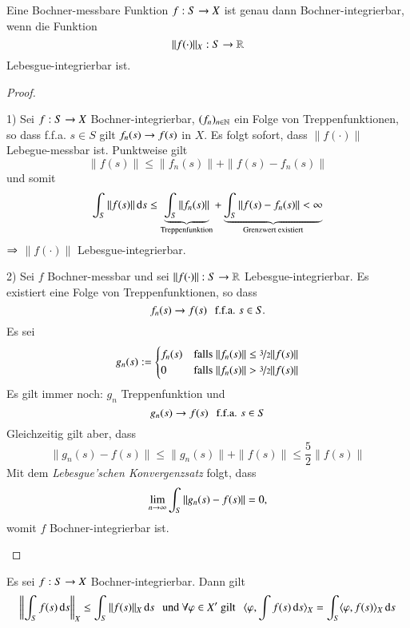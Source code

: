 \begin{theorem}\label{4.26}
    Eine Bochner-messbare Funktion $f: S\rightarrow X$ ist genau dann Bochner-integrierbar, wenn die Funktion
    \[
        \|f(\cdot)\|_X :S \rightarrow \mathbb{R}
    \]
    Lebesgue-integrierbar ist.
\end{theorem}

\begin{proof}
    \begin{description}
    \item{1)}
    Sei $f:S\rightarrow X$ Bochner-integrierbar, $(f_n)_{n\in \mathbb{N}}$ ein Folge von Treppenfunktionen, so dass
    f.f.a. $s\in S$ gilt $f_n(s)\rightarrow f(s)$ in $X$. Es folgt sofort, dass $\|f(\cdot)\|$ Lebegue-messbar
     ist. Punktweise gilt
     \[
        \|f(s)\|\leq \|f_n(s)\|+ \|f(s)-f_n(s)\|
     \]
     und somit
     \[
        \int_S\|f(s)\|\, \mathrm{d} s\leq \underbrace{\int_S\|f_n(s)\|}_{\text{Treppenfunktion}}
            + \underbrace{\int_S\|f(s)-f_n(s)\|<\infty}_{\text{Grenzwert existiert}}
     \]
    $\Rightarrow$ $\|f(\cdot)\|$ Lebesgue-integrierbar.
    \item{2)}
    Sei $f$ Bochner-messbar und sei $\|f(\cdot)\|:S \rightarrow \mathbb{R}$ Lebesgue-integrierbar. Es existiert eine
    Folge von Treppenfunktionen, so dass
    \[
        f_n(s) \rightarrow f(s) \hspace{.25cm} \text{f.f.a. } s\in S .
    \]
    Es sei
    \[
        g_n(s):= \begin{cases} f_n(s)& \text{falls } \|f_n(s)\|\leq \nicefrac32 \|f(s)\| \\
                 0&\text{falls } \|f_n(s)\|>\nicefrac32 \|f(s)\|\end{cases}
    \]
    Es gilt immer noch: $g_n$ Treppenfunktion und
    \[
        g_n(s)\rightarrow f(s) \hspace{.25cm} \text{f.f.a. } s\in S
    \]
    Gleichzeitig gilt aber, dass
    \[
        \|g_n(s)-f(s)\|\leq \|g_n(s)\|+\|f(s)\| \leq \frac52\|f(s)\|
    \]
    Mit dem \textit{Lebesgue'schen Konvergenzsatz} folgt, dass
    \[
        \lim_{n\rightarrow\infty} \int_S \|g_n(s)-f(s)\|=0,
    \]
    womit $f$ Bochner-integrierbar ist. 
    \end{description}    
    \[ \]
\end{proof}

\begin{cor}\label{4.27}
    Es sei $f:S\rightarrow X$ Bochner-integrierbar. Dann gilt
    \[
        \left\| \int_S f(s)\, \mathrm{d} s \right\|_X\leq\int_S\|f(s)\|_X \, \mathrm{d} s \hspace{.25cm}  \text{und } \forall \varphi \in X'
        \text{ gilt} \hspace{.25cm}\langle \varphi, \int f(s)\, \mathrm{d} s \rangle _X = \int_S \langle \varphi, f(s)\rangle_X \, \mathrm{d} s
    \]
\end{cor}

